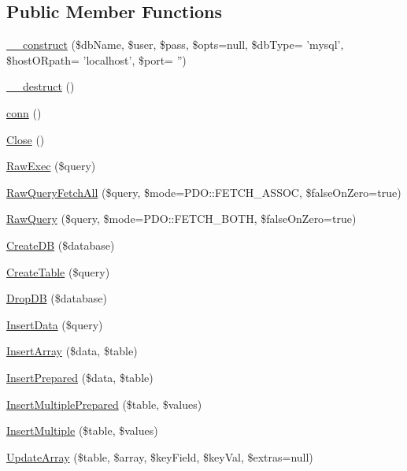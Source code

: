 \subsection*{Public Member Functions}
\begin{DoxyCompactItemize}
\item 
\hyperlink{classdb_p_d_o_a7f93adf2a111686240ea50fdd8bd8ebf}{\-\_\-\-\_\-construct} (\$db\-Name, \$user, \$pass, \$opts=null, \$db\-Type= 'mysql', \$host\-O\-Rpath= 'localhost', \$port= '')
\item 
\hyperlink{classdb_p_d_o_a421831a265621325e1fdd19aace0c758}{\-\_\-\-\_\-destruct} ()
\item 
\hyperlink{classdb_p_d_o_a57eb4521bd6f86c09be488cf2dbbbce7}{conn} ()
\item 
\hyperlink{classdb_p_d_o_a2fd4e06444aa4ace4cab6d6950ba2bb2}{Close} ()
\item 
\hyperlink{classdb_p_d_o_a1a480f419105d0b00c2a789ebedbb765}{Raw\-Exec} (\$query)
\item 
\hyperlink{classdb_p_d_o_ad859e8675db57294ba6a613bc4d14275}{Raw\-Query\-Fetch\-All} (\$query, \$mode=P\-D\-O\-::\-F\-E\-T\-C\-H\-\_\-\-A\-S\-S\-O\-C, \$false\-On\-Zero=true)
\item 
\hyperlink{classdb_p_d_o_a95a881be3b8672a22dc24cc44d375d69}{Raw\-Query} (\$query, \$mode=P\-D\-O\-::\-F\-E\-T\-C\-H\-\_\-\-B\-O\-T\-H, \$false\-On\-Zero=true)
\item 
\hyperlink{classdb_p_d_o_a3c670e6dfd1079f88da108bd17e6c3ed}{Create\-D\-B} (\$database)
\item 
\hyperlink{classdb_p_d_o_aeb142d5976a4127f68c245aa387b9872}{Create\-Table} (\$query)
\item 
\hyperlink{classdb_p_d_o_a66aa25c4b32911bb80636a76ae8b4085}{Drop\-D\-B} (\$database)
\item 
\hyperlink{classdb_p_d_o_a950361852a54211a990d624310b72881}{Insert\-Data} (\$query)
\item 
\hyperlink{classdb_p_d_o_a825363733f9f9c350717b67e8ce2c373}{Insert\-Array} (\$data, \$table)
\item 
\hyperlink{classdb_p_d_o_a8ad62f7b18a59b358aa4222db6faef9c}{Insert\-Prepared} (\$data, \$table)
\item 
\hyperlink{classdb_p_d_o_a9d533695a61e9f7f253e9d1e82fe1b8e}{Insert\-Multiple\-Prepared} (\$table, \$values)
\item 
\hyperlink{classdb_p_d_o_af69a5485cb48e8bc7008e986649365ca}{Insert\-Multiple} (\$table, \$values)
\item 
\hyperlink{classdb_p_d_o_a722b9874cb2622dcc9fcafbbac9c0463}{Update\-Array} (\$table, \$array, \$key\-Field, \$key\-Val, \$extras=null)

\end{DoxyCompactItemize}
